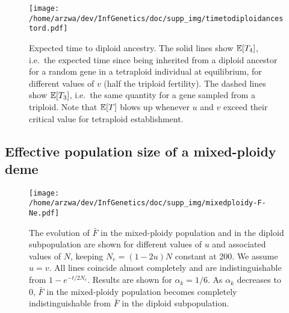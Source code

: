 \documentclass[11pt,a4paper]{article}
\begin{document}
\begin{figure}
\centering
\texttt{[image: /home/arzwa/dev/InfGenetics/doc/supp\_img/timetodiploidancestord.pdf]}
\caption{Expected time to diploid ancestry. The solid lines show
\(\mathbb{E}[T_4]\), i.e.~the expected time since being inherited from a
diploid ancestor for a random gene in a tetraploid individual at
equilibrium, for different values of \(v\) (half the triploid
fertility). The dashed lines show \(\mathbb{E}[T_3]\), i.e.~the same quantity
for a gene sampled from a triploid. Note that \(\mathbb{E}[T]\) blows up
whenever \(u\) and \(v\) exceed their critical value for tetraploid
establishment. \label{fig:ttdip}}
\end{figure}

\subsection{Effective population size of a mixed-ploidy deme \label{sec:effsize}}

\begin{figure}
\centering
\texttt{[image: /home/arzwa/dev/InfGenetics/doc/supp\_img/mixedploidy-F-Ne.pdf]}
\caption{The evolution of \(\bar{F}\) in the mixed-ploidy population and
in the diploid subpopulation are shown for different values of \(u\) and
associated values of \(N\), keeping \(N_e = (1-2u)N\) constant at 200.
We assume \(u=v\). All lines coincide almost completely and are
indistinguishable from \(1-e^{-t/2N_e}\). Results are shown for
\(\alpha_k=1/6\). As \(\alpha_k\) decreases to 0, \(\bar{F}\) in the
mixed-ploidy population becomes completely indistinguishable from
\(\bar{F}\) in the diploid subpopulation.}\label{fig:fNe}
\end{figure}
\end{document}
